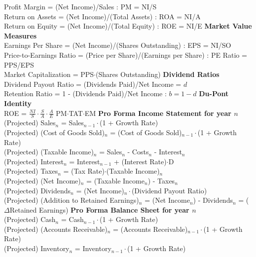 \documentclass{article}
\begin{document}
Profit Margin = (Net Income)/Sales : PM = NI/S \\
Return on Assets = (Net Income)/(Total Assets) : ROA = NI/A \\
Return on Equity = (Net Income)/(Total Equity) : ROE = NI/E
\newline
\textbf{Market Value Measures} \\
Earnings Per Share = (Net Income)/(Shares Outstanding) : EPS = NI/SO \\
Price-to-Earnings Ratio = (Price per Share)/(Earnings per Share) : PE Ratio = PPS/EPS \\
Market Capitalization = PPS$\cdot$(Shares Outstanding)
\newline
\textbf{Dividend Ratios} \\
Dividend Payout Ratio = (Dividends Paid)/Net Income = $d$ \\
Retention Ratio = 1 - (Dividends Paid)/Net Income : $b = 1 - d$
\newline
\textbf{Du-Pont Identity} \\
ROE = $\frac{NI}{S} \cdot \frac{S}{A} \cdot \frac{A}{E}$ PM$\cdot$TAT$\cdot$EM
\newline
\textbf{Pro Forma Income Statement for year $n$} \\
(Projected) Sales$_n$ = Sales$_{n - 1} \cdot$(1 + Growth Rate) \\
(Projected) (Cost of Goods Sold)$_n$ = (Cost of Goods Sold)$_{n - 1} \cdot$(1 + Growth Rate) \\
(Projected) (Taxable Income)$_n$ = Sales$_n$ - Costs$_n$ - Interest$_n$ \\
(Projected) Interest$_n$ = Interest$_{n - 1}$ + (Interest Rate)$\cdot$D \\
(Projected) Taxes$_n$ = (Tax Rate)$\cdot$(Taxable Income)$_n$ \\
(Projected) (Net Income)$_n$ = (Taxable Income$_n$) - Taxes$_n$ \\
(Projected) Dividends$_n$ = (Net Income)$_n \cdot$(Dividend Payout Ratio) \\
(Projected) (Addition to Retained Earnings)$_n$ = (Net Income$_n$) - Dividends$_n$ = ($\Delta$Retained Earnings)
\newline
\textbf{Pro Forma Balance Sheet for year $n$} \\
(Projected) Cash$_n$ = Cash$_{n - 1} \cdot$(1 + Growth Rate) \\
(Projected) (Accounts Receivable)$_n$ = (Accounts Receivable)$_{n - 1} \cdot$(1 + Growth Rate) \\
(Projected) Inventory$_n$ = Inventory$_{n - 1} \cdot$(1 + Growth Rate) \\
\end{document}
